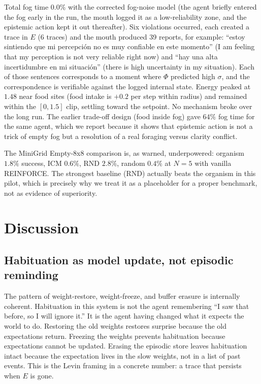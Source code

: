\documentclass[11pt,a4paper]{article}
\begin{document}
Total fog time $0.0\%$ with the corrected fog-noise model (the agent briefly entered the fog early in the run, the mouth logged it as a low-reliability zone, and the epistemic action kept it out thereafter). Six violations occurred, each created a trace in $E$ (6 traces) and the mouth produced 39 reports, for example: ``estoy sintiendo que mi percepci\'on no es muy confiable en este momento'' (I am feeling that my perception is not very reliable right now) and ``hay una alta incertidumbre en mi situaci\'on'' (there is high uncertainty in my situation). Each of those sentences corresponds to a moment where $\Phi$ predicted high $\sigma$, and the correspondence is verifiable against the logged internal state. Energy peaked at $1.48$ near food sites (food intake is $+0.2$ per step within radius) and remained within the $[0,1.5]$ clip, settling toward the setpoint. No mechanism broke over the long run. The earlier trade-off design (food inside fog) gave $64\%$ fog time for the same agent, which we report because it shows that epistemic action is not a trick of empty fog but a resolution of a real foraging versus clarity conflict.

The MiniGrid Empty-8x8 comparison is, as warned, underpowered: organism $1.8\%$ success, ICM $0.6\%$, RND $2.8\%$, random $0.4\%$ at $N=5$ with vanilla REINFORCE. The strongest baseline (RND) actually beats the organism in this pilot, which is precisely why we treat it as a placeholder for a proper benchmark, not as evidence of superiority.

\section{Discussion}
\label{sec:discussion}

\subsection{Habituation as model update, not episodic reminding}

The pattern of weight-restore, weight-freeze, and buffer erasure is internally coherent. Habituation in this system is not the agent remembering ``I saw that before, so I will ignore it.'' It is the agent having changed what it expects the world to do. Restoring the old weights restores surprise because the old expectations return. Freezing the weights prevents habituation because expectations cannot be updated. Erasing the episodic store leaves habituation intact because the expectation lives in the slow weights, not in a list of past events. This is the Levin framing in a concrete number: a trace that persists when $E$ is gone.
\end{document}
